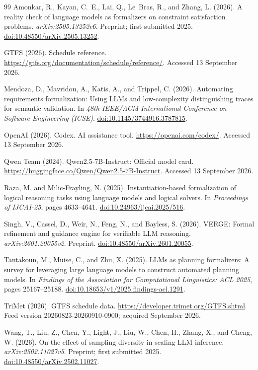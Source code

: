\documentclass[a4paper,twoside]{article}
\begin{document}
\begin{thebibliography}{99}
Amonkar, R., Kayan, C.~E., Lai, Q., Le~Bras, R., and Zhang, L. (2026).
A reality check of language models as formalizers on constraint satisfaction problems.
\emph{arXiv:2505.13252v6}. Preprint; first submitted 2025.
\href{https://arxiv.org/abs/2505.13252v6}{doi:10.48550/arXiv.2505.13252}.

GTFS (2026). Schedule reference.
\url{https://gtfs.org/documentation/schedule/reference/}. Accessed 13 September 2026.

Mendoza, D., Mavridou, A., Katis, A., and Trippel, C. (2026).
Automating requirements formalization: Using LLMs and low-complexity distinguishing traces for semantic validation.
In \emph{48th IEEE/ACM International Conference on Software Engineering (ICSE)}.
\href{https://doi.org/10.1145/3744916.3787815}{doi:10.1145/3744916.3787815}.

OpenAI (2026). Codex. AI assistance tool.
\url{https://openai.com/codex/}. Accessed 13 September 2026.

Qwen Team (2024). Qwen2.5-7B-Instruct: Official model card.
\url{https://huggingface.co/Qwen/Qwen2.5-7B-Instruct}. Accessed 13 September 2026.

Raza, M. and Milic-Frayling, N. (2025).
Instantiation-based formalization of logical reasoning tasks using language models and logical solvers.
In \emph{Proceedings of IJCAI-25}, pages 4633--4641.
\href{https://doi.org/10.24963/ijcai.2025/516}{doi:10.24963/ijcai.2025/516}.

Singh, V., Cassel, D., Weir, N., Feng, N., and Bayless, S. (2026).
VERGE: Formal refinement and guidance engine for verifiable LLM reasoning.
\emph{arXiv:2601.20055v2}. Preprint.
\href{https://arxiv.org/abs/2601.20055v2}{doi:10.48550/arXiv.2601.20055}.

Tantakoun, M., Muise, C., and Zhu, X. (2025).
LLMs as planning formalizers: A survey for leveraging large language models to construct automated planning models.
In \emph{Findings of the Association for Computational Linguistics: ACL 2025}, pages 25167--25188.
\href{https://doi.org/10.18653/v1/2025.findings-acl.1291}{doi:10.18653/v1/2025.findings-acl.1291}.

TriMet (2026). GTFS schedule data.
\url{https://developer.trimet.org/GTFS.shtml}. Feed version 20260823-20260910-0900; acquired September 2026.

Wang, T., Liu, Z., Chen, Y., Light, J., Liu, W., Chen, H., Zhang, X., and Cheng, W. (2026).
On the effect of sampling diversity in scaling LLM inference.
\emph{arXiv:2502.11027v5}. Preprint; first submitted 2025.
\href{https://arxiv.org/abs/2502.11027v5}{doi:10.48550/arXiv.2502.11027}.
\end{thebibliography}
\end{document}
